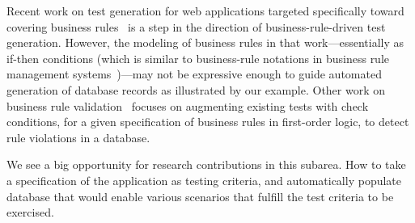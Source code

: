 Recent work on test generation for web applications targeted specifically toward
covering business rules~\cite{Thummalapenta:2013} is a step in the direction of
business-rule-driven test generation. However, the modeling of business rules in
that work---essentially as if-then conditions (which is similar to business-rule
notations in business rule management systems~\cite{drools,ilog})---may not be
expressive enough to guide automated generation of database records as
illustrated by our example. Other work on business rule
validation~\cite{Willmor:2006} focuses on augmenting existing tests with check
conditions, for a given specification of business rules in first-order logic, to
detect rule violations in a database.


We see a big opportunity for research contributions in this subarea. How to take
a specification of the application as testing criteria, and automatically
populate database that would enable various scenarios that fulfill the test
criteria to be exercised.
